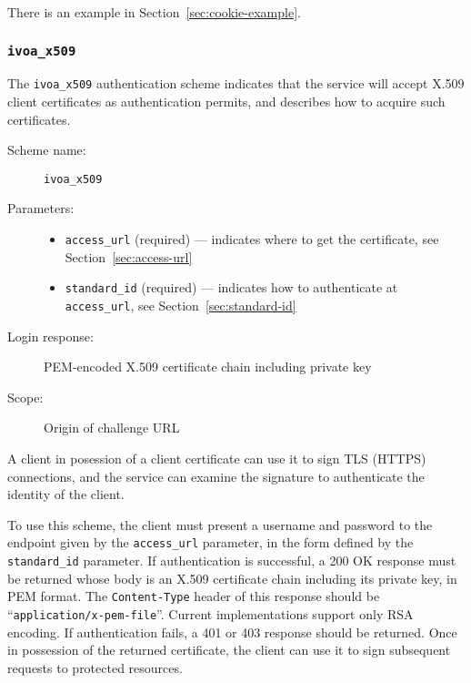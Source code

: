 \documentclass[11pt,a4paper]{ivoa}
\newcommand{\header}[1]{{\tt #1}}
\begin{document}
There is an example in Section~\ref{sec:cookie-example}.


\subsubsection{\mbox{\tt ivoa\_x509}}\label{sec:ivoa-x509}

The \verb|ivoa_x509| authentication scheme indicates that the service
will accept X.509 client certificates as authentication permits,
and describes how to acquire such certificates.

\begin{description}
  \item[Scheme name:] \verb|ivoa_x509|
  \item[Parameters:] \mbox{}
  \begin{itemize}
    \item \verb|access_url| (required) ---
          indicates where to get the certificate,
          see Section~\ref{sec:access-url}
    \item \verb|standard_id| (required) ---
          indicates how to authenticate at \verb|access_url|,
          see Section~\ref{sec:standard-id}
  \end{itemize}
  \item[Login response:] PEM-encoded X.509 certificate chain
                         including private key
  \item[Scope:] Origin of challenge URL
\end{description}


A client in posession of a client certificate can use it to
sign TLS (HTTPS) connections, and the service can examine the signature
to authenticate the identity of the client.

To use this scheme, the client must present a username and password
to the endpoint given by the \verb|access_url| parameter,
in the form defined by the \verb|standard_id| parameter.
If authentication is successful, a 200 OK response must be returned
whose body is an X.509 certificate chain including its private key,
in PEM format.  The \header{Content-Type} header of this response
should be ``{\tt application/x-pem-file}''. 
Current implementations support only RSA encoding.
If authentication fails, a 401 or 403 response should be returned.
Once in possession of the returned certificate,
the client can use it to sign subsequent requests to protected resources.
\end{document}
